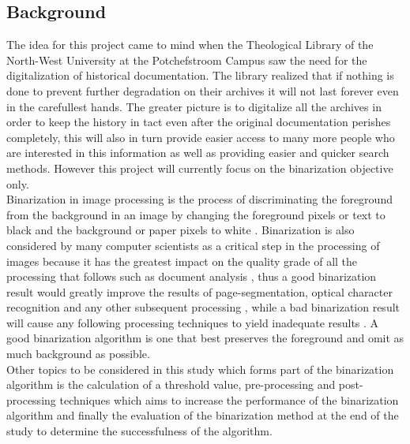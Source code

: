 \documentclass[11pt]{article}
\begin{document}
    	\subsection{Background}
    		The idea for this project came to mind when the Theological Library of the North-West University at the Potchefstroom Campus saw the need for the digitalization of historical documentation. The library realized that if nothing is done to prevent further degradation on their archives it will not last forever even in the carefullest hands. The greater picture is to digitalize all the archives in order to keep the history in tact even after the original documentation perishes completely, this will also in turn provide easier access to many more people who are interested in this information as well as providing easier and quicker search methods. However this project will currently focus on the binarization objective only.\\

    		Binarization in image processing is the process of discriminating the foreground from the background in an image by changing the foreground pixels or text to black and the background or paper pixels to white \cite{ntogas2008binarization}. Binarization is also considered by many computer scientists as a critical step in the processing of images because it has the greatest impact on the quality grade of all the processing that follows such as document analysis \cite{jacob2014survey}, thus a good binarization result would greatly improve the results of page-segmentation, optical character recognition and any other subsequent processing \cite{agrawal2011stroke}, while a bad binarization result will cause any following processing techniques to yield inadequate results \cite{howe2011laplacian}. A good binarization algorithm is one that best preserves the foreground and omit as much background as possible.\\

    		Other topics to be considered in this study which forms part of the binarization algorithm is the calculation of a threshold value, pre-processing and post-processing techniques which aims to increase the performance of the binarization algorithm and finally the evaluation of the binarization method at the end of the study to determine the successfulness of the algorithm.
\end{document}
